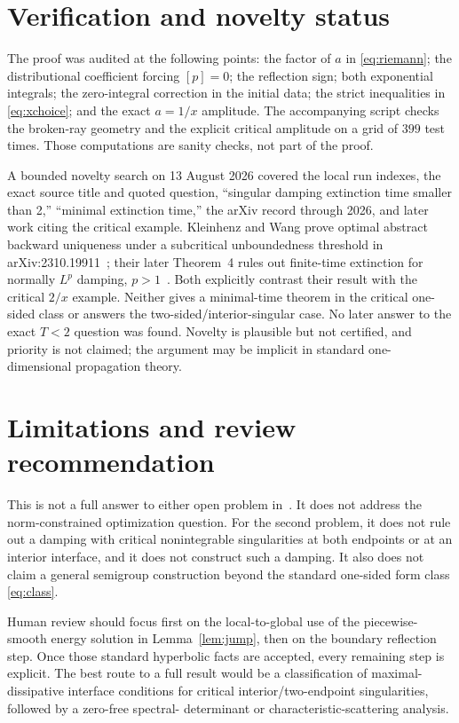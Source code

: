 \documentclass[11pt]{article}
\begin{document}
\section{Verification and novelty status}

The proof was audited at the following points: the factor of $a$ in
\eqref{eq:riemann}; the distributional coefficient forcing $[p]=0$; the
reflection sign; both exponential integrals; the zero-integral correction in
the initial data; the strict inequalities in \eqref{eq:xchoice}; and the
exact $a=1/x$ amplitude.  The accompanying script checks the broken-ray
geometry and the explicit critical amplitude on a grid of $399$ test times.
Those computations are sanity checks, not part of the proof.

A bounded novelty search on 13 August 2026 covered the local run indexes, the
exact source title and quoted question, ``singular damping extinction time
smaller than 2,'' ``minimal extinction time,'' the arXiv record through 2026,
and later work citing the critical example.  Kleinhenz and Wang prove optimal
abstract backward uniqueness under a subcritical unboundedness threshold in
arXiv:2310.19911~\cite{KW23}; their later Theorem~4 rules out finite-time
extinction for normally $L^p$ damping, $p>1$~\cite{KW26}.  Both explicitly
contrast their result with the critical $2/x$ example.  Neither gives a
minimal-time theorem in the critical one-sided class or answers the
two-sided/interior-singular case.  No later answer to the exact $T<2$ question
was found.  Novelty is plausible but not certified, and priority is not
claimed; the argument may be implicit in standard one-dimensional
propagation theory.

\section{Limitations and review recommendation}

This is not a full answer to either open problem in~\cite{FHS}.  It does not
address the norm-constrained optimization question.  For the second problem,
it does not rule out a damping with critical nonintegrable singularities at
both endpoints or at an interior interface, and it does not construct such a
damping.  It also does not claim a general semigroup construction beyond the
standard one-sided form class \eqref{eq:class}.

Human review should focus first on the local-to-global use of the
piecewise-smooth energy solution in Lemma~\ref{lem:jump}, then on the boundary
reflection step.  Once those standard hyperbolic facts are accepted, every
remaining step is explicit.  The best route to a full result would be a
classification of maximal-dissipative interface conditions for critical
interior/two-endpoint singularities, followed by a zero-free spectral-
determinant or characteristic-scattering analysis.
\end{document}
